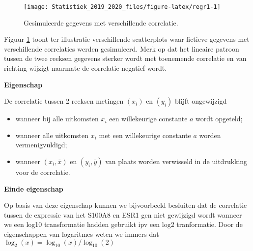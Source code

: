 \documentclass[12pt,dutch,coursenotes]{book}
\theoremstyle{definition}
\theoremstyle{definition}
\theoremstyle{definition}
\theoremstyle{remark}
\begin{document}
\begin{figure}

{\centering \texttt{[image: Statistiek\_2019\_2020\_files/figure-latex/regr1-1]} 

}

\caption{Gesimuleerde gegevens met verschillende correlatie.}\label{fig:regr1}
\end{figure}

Figuur \ref{fig:regr1} toont ter illustratie verschillende scatterplots
waar fictieve gegevens met verschillende correlaties werden gesimuleerd.
Merk op dat het lineaire patroon tussen de twee reeksen gegevens sterker
wordt met toenemende correlatie en van richting wijzigt naarmate de
correlatie negatief wordt.

\textbf{Eigenschap}

De correlatie tussen 2 reeksen metingen \((x_i)\) en \((y_i)\) blijft
ongewijzigd

\begin{itemize}
\item
  wanneer bij alle uitkomsten \(x_i\) een willekeurige constante \(a\)
  wordt opgeteld;
\item
  wanneer alle uitkomsten \(x_i\) met een willekeurige constante \(a\)
  worden vermenigvuldigd;
\item
  wanneer \((x_i,\bar x)\) en \((y_i,\bar y)\) van plaats worden
  verwisseld in de uitdrukking voor de correlatie.
\end{itemize}

\textbf{Einde eigenschap}

Op basis van deze eigenschap kunnen we bijvoorbeeld besluiten dat de
correlatie tussen de expressie van het S100A8 en ESR1 gen niet gewijzigd
wordt wanneer we een log10 transformatie hadden gebruikt ipv een log2
tranformatie. Door de eigenschappen van logaritmes weten we immers dat
\(\log_{2}(x)=\log_{10}(x)/\log_{10}(2)\)
\end{document}
